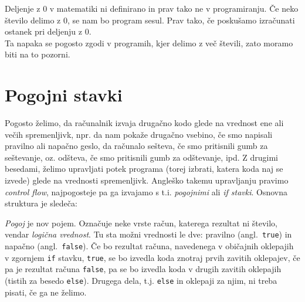 \documentclass{book}
\begin{document}
\begin{errors}
Deljenje z 0 v matematiki ni definirano in prav tako ne v programiranju. Če neko število delimo z 0, se nam bo program sesul. Prav tako, če poskušamo izračunati ostanek pri deljenju z 0. \\
Ta napaka se pogosto zgodi v programih, kjer delimo z več števili, zato moramo biti na to pozorni.
\end{errors}

\chapter{Pogojni stavki}

Pogosto želimo, da računalnik izvaja drugačno kodo glede na vrednost ene ali
večih spremenljivk, npr. da nam pokaže drugačno vsebino, če smo napisali
pravilno ali napačno geslo, da računalo sešteva, če smo pritisnili gumb za
seštevanje, oz. odšteva, če smo pritisnili gumb za odštevanje, ipd. Z drugimi
besedami, želimo upravljati potek programa (torej izbrati, katera koda naj
se izvede) glede na vrednosti spremenljivk. Angleško takemu upravljanju
pravimo \emph{control flow}, najpogosteje pa ga izvajamo s t.i. \emph{pogojnimi}
ali \emph{if stavki}. Osnovna struktura je sledeča:

\begin{examples}


\end{examples}

\emph{Pogoj} je nov pojem. Označuje neke vrste račun, katerega rezultat ni
število, vendar \emph{logična vrednost}. Tu sta možni vrednosti le dve:
pravilno (angl.~\verb+true+) in napačno (angl.~\verb+false+). Če bo rezultat
računa, navedenega v običajnih oklepajih v zgornjem \verb+if+ stavku,
\verb+true+,
se bo izvedla koda znotraj prvih zavitih oklepajev, če pa je rezultat računa
\verb+false+, pa se bo izvedla koda v drugih zavitih oklepajih (tistih za besedo
\verb+else+). Drugega dela, t.j. \verb+else+ in oklepaji za njim, ni treba
pisati, če ga ne želimo.
\end{document}
